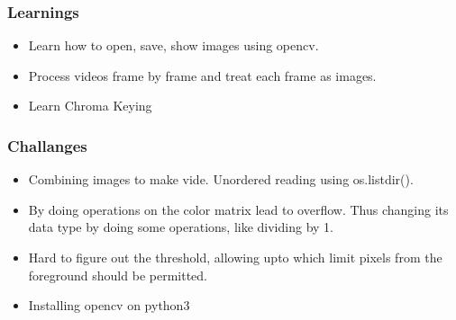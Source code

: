 \documentclass[11pt]{article}
\providecommand{\tightlist}{%
      \setlength{\itemsep}{0pt}\setlength{\parskip}{0pt}}
\begin{document}
    \subsubsection{Learnings}\label{learnings}

\begin{itemize}
\tightlist
\item
  Learn how to open, save, show images using opencv.
\item
  Process videos frame by frame and treat each frame as images.
\item
  Learn Chroma Keying
\end{itemize}

    \subsubsection{Challanges}\label{challanges}

\begin{itemize}
\tightlist
\item
  Combining images to make vide. Unordered reading using os.listdir().
\item
  By doing operations on the color matrix lead to overflow. Thus
  changing its data type by doing some operations, like dividing by 1.
\item
  Hard to figure out the threshold, allowing upto which limit pixels
  from the foreground should be permitted.
\item
  Installing opencv on python3
\end{itemize}


    
    
    
    
\end{document}
